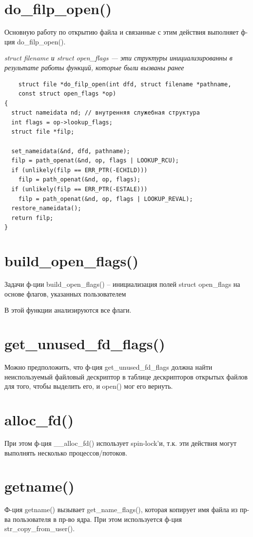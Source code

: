 \section{do\_filp\_open()}
Основную работу по открытию файла и связанные с этим действия выполняет ф-ция do\_filp\_open().

\textit{struct filename и struct open\_flags --- эти структуры инициализированны в результате работы функций, которые были вызваны ранее}

\begin{lstlisting}
    struct file *do_filp_open(int dfd, struct filename *pathname,
    const struct open_flags *op)
{
  struct nameidata nd; // внутренняя служебная структура
  int flags = op->lookup_flags;
  struct file *filp;

  set_nameidata(&nd, dfd, pathname);
  filp = path_openat(&nd, op, flags | LOOKUP_RCU);
  if (unlikely(filp == ERR_PTR(-ECHILD)))
    filp = path_openat(&nd, op, flags);
  if (unlikely(filp == ERR_PTR(-ESTALE)))
    filp = path_openat(&nd, op, flags | LOOKUP_REVAL);
  restore_nameidata();
  return filp;
}
\end{lstlisting}

\section{build\_open\_flags()}
Задачи ф-ции build\_open\_flags() -- инициализация полей struct open\_flags на основе флагов, указанных пользователем

В этой функции анализируются все флаги.

\section{get\_unused\_fd\_flags()}
Можно предположить, что ф-ция get\_unused\_fd\_flags должна найти неиспользуемый файловый дескриптор в таблице дескрипторов открытых файлов для того, чтобы выделить его, и open() мог его вернуть.

\section{alloc\_fd()}
При этом ф-ция \_\_alloc\_fd() использует spin-lock'и, т.к. эти действия могут выполнять несколько процессов/потоков.

\section{getname()}
Ф-ция getname() вызывает get\_name\_flags(), которая копирует имя файла из пр-ва пользователя в пр-во ядра. При этом используется ф-ция str\_copy\_from\_user().

